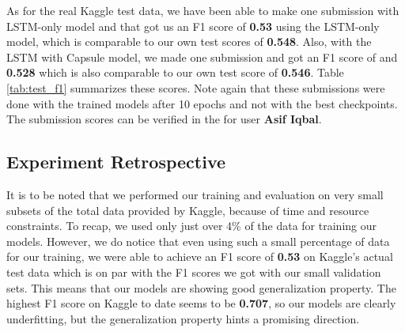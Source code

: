 \documentclass[11pt,twocolumn,letterpaper]{article}
\newcommand{\MYhref}[3][blue]{\href{#2}{\color{#1}{#3}}}%
\begin{document}
\begin{table}[ht!]  
  \centering
  \caption{Classification report on our test data}
  \label{tab:class_report}
\end{table}

As for the real Kaggle test data, we have been able to make one submission with LSTM-only model and that got us an F1 score of \textbf{0.53} using the LSTM-only model, which is comparable to our own test scores of \textbf{0.548}. Also, with the LSTM with Capsule model, we made one submission and got an F1 score of and \textbf{0.528} which is also comparable to our own test score of \textbf{0.546}. Table \ref{tab:test_f1} summarizes these scores. Note again that these submissions were done with the trained models after 10 epochs and not with the best checkpoints. The submission scores can be verified in the \MYhref{https://www.kaggle.com/c/quora-insincere-questions-classification/leaderboard}{Kaggle Leaderboard} for user \textbf{Asif Iqbal}.

\begin{table}[ht!]  
  \centering
  \caption{F1 scores on test data}
  \label{tab:test_f1}
\end{table}

\subsection{Experiment Retrospective}

It is to be noted that we performed our training and evaluation on very small subsets of the total data provided by Kaggle, because of time and resource constraints. To recap, we used only just over 4\% of the data for training our models. However, we do notice that even using such a small percentage of data for our training, we were able to achieve an F1 score of \textbf{0.53} on Kaggle's actual test data which is on par with the F1 scores we got with our small validation sets. This means that our models are showing good generalization property. The highest F1 score on Kaggle to date seems to be \textbf{0.707}, so our models are clearly underfitting, but the generalization property hints a promising direction.
\end{document}
